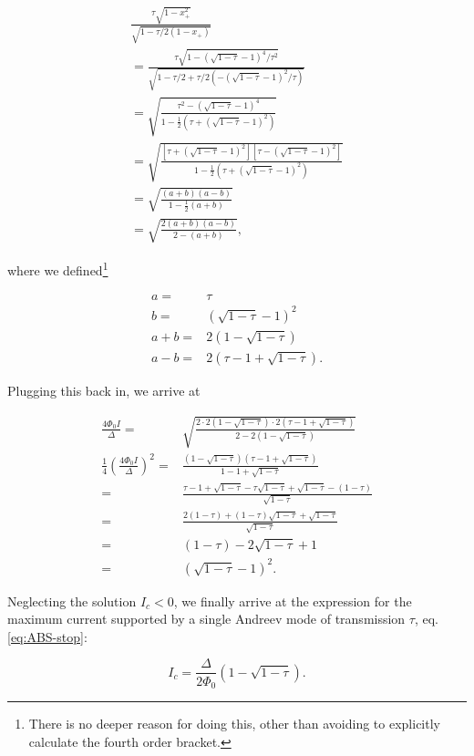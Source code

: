 \begin{eqnarray}
\frac{\tau\sqrt{1-x_{+}^2}}{\sqrt{1-\tau/2(1-x_{+})}} \\
= \frac{ \tau\sqrt{1-(\sqrt{1-\tau}-1)^4/\tau^2} }{ \sqrt{1-\tau/2+\tau/2(-(\sqrt{1-\tau}-1)^2/\tau)} } \\
	= \sqrt{ \frac{ \tau^2-(\sqrt{1-\tau}-1)^4 }{ 1-\frac{1}{2} \left( \tau+(\sqrt{1-\tau}-1)^2 \right) } } \\
	= \sqrt{ \frac{ \left\lbrack \tau+(\sqrt{1-\tau}-1)^2 \right\rbrack \left\lbrack \tau-(\sqrt{1-\tau}-1)^2 \right\rbrack }{ 1-\frac{1}{2} \left( \tau+(\sqrt{1-\tau}-1)^2 \right) } } \\
	= \sqrt{\frac{(a+b)(a-b)}{1-\frac{1}{2}(a+b)}} \\ 
	= \sqrt{\frac{2(a+b)(a-b)}{2-(a+b)}},
\end{eqnarray}

where we defined\footnote{There is no deeper reason for doing this, other than avoiding to explicitly calculate the fourth order bracket.}

\begin{eqnarray}
a =& \tau \\
b =& (\sqrt{1-\tau}-1)^2 \\
a+b =& 2(1-\sqrt{1-\tau}) \\
a-b =& 2(\tau-1+\sqrt{1-\tau}).
\end{eqnarray}

Plugging this back in, we arrive at

\begin{eqnarray}
\frac{4\Phi_0I}{\Delta} =& \sqrt{ \frac{ 2\cdot2(1-\sqrt{1-\tau}) \cdot 2(\tau-1+\sqrt{1-\tau}) }{ 2-2(1-\sqrt{1-\tau}) } } \\
\frac{1}{4}\left( \frac{4\Phi_0I}{\Delta} \right)^2 =& \frac{ (1-\sqrt{1-\tau})(\tau-1+\sqrt{1-\tau}) }{ 1-1+\sqrt{1-\tau} } \\
=& \frac{\tau-1+\sqrt{1-\tau}-\tau\sqrt{1-\tau}+\sqrt{1-\tau}-(1-\tau)}{\sqrt{1-\tau}} \\
=& \frac{2(1-\tau)+(1-\tau)\sqrt{1-\tau}+\sqrt{1-\tau}}{\sqrt{1-\tau}} \\
=& (1-\tau)-2\sqrt{1-\tau}+1 \\
=& (\sqrt{1-\tau}-1)^2.
\end{eqnarray}

Neglecting the solution $I_c<0$, we finally arrive at the expression for the maximum current supported by a single Andreev mode of transmission $\tau$, eq.\ref{eq:ABS-stop}:

\begin{equation}
I_c=\frac{\Delta}{2\Phi_0} \left( 1-\sqrt{1-\tau} \right).
\end{equation}


